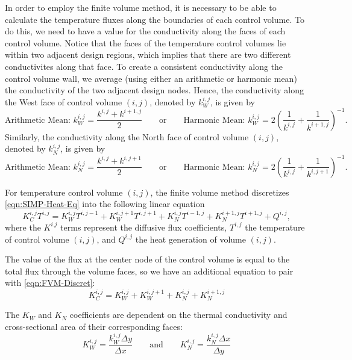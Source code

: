 In order to employ the finite volume method, it is necessary to be able to calculate the temperature fluxes along the boundaries of each control volume. To do this, we need to have a value for the conductivity along the faces of each control volume. Notice that the faces of the temperature control volumes lie within two adjacent design regions, which implies that there are two different conductivites along that face. To create a consistent conductivity along the control volume wall, we average (using either an arithmetic or harmonic mean) the conductivity of the two adjacent design nodes. Hence, the conductivity along the West face of control volume $(i,j)$, denoted by $k^{i,j}_W$, is given by
\begin{equation}
	\text{Arithmetic Mean: }k^{i,j}_W=\frac{k^{i,j}+k^{i+1,j}}{2}\qquad\text{or}\qquad\text{Harmonic Mean: }k^{i,j}_W=2\left(\frac{1}{k^{i,j}}+\frac{1}{k^{i+1,j}}\right)^{-1}.\label{eqn:k_W-Average-Filter}
\end{equation}
Similarly, the conductivity along the North face of control volume $(i,j)$, denoted by $k^{i,j}_N$, is given by
\begin{equation}
	\text{Arithmetic Mean: }k^{i,j}_N=\frac{k^{i,j}+k^{i,j+1}}{2}\qquad\text{or}\qquad\text{Harmonic Mean: }k^{i,j}_N=2\left(\frac{1}{k^{i,j}}+\frac{1}{k^{i,j+1}}\right)^{-1}.\label{eqn:k_N-Average-Filter}
\end{equation}

For temperature control volume $(i,j)$, the finite volume method discretizes \eqref{eqn:SIMP-Heat-Eq} into the following linear equation
\begin{equation}
	K^{i,j}_C T^{i,j}=K_W^{i,j}T^{i,j-1}+K_W^{i,j+1}T^{i,j+1}+K_N^{i,j}T^{i-1,j}+K_N^{i+1,j}T^{i+1,j}+Q^{i,j},\label{eqn:FVM-Discret}
\end{equation}
where the $K^{i.j}$ terms represent the diffusive flux coefficients, $T^{i,j}$ the temperature of control volume $(i,j)$, and $Q^{i,j}$ the heat generation of volume $(i,j)$.

The value of the flux at the center node of the control volume is equal to the total flux through the volume faces, so we have an additional equation to pair with \eqref{eqn:FVM-Discret}:
\begin{equation}
	K^{i,j}_C=K_W^{i,j}+K_W^{i,j+1}+K_N^{i,j}+K_N^{i+1,j}\label{eqn:CenterFluxCoeff}
\end{equation}

The $K_W$ and $K_N$ coefficients are dependent on the thermal conductivity and cross-sectional area of their corresponding faces:
\begin{equation}
	K_W^{i,j}=\frac{k_W^{i,j}\Delta y}{\Delta x}\qquad\text{and}\qquad K_N^{i,j}=\frac{k_N^{i,j}\Delta x}{\Delta y}\label{eqn:K-Coeffs}
\end{equation}

